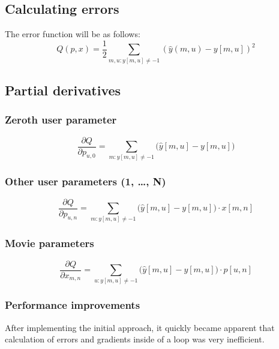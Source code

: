 \documentclass[12pt]{article}
\begin{document}
\subsection{Calculating errors}

The error function will be as follows:
$$
	Q(p,x) = \frac{1}{2} \sum\limits_{m,u : y[m,u] \neq -1} (\hat{y}(m,u) - y[m,u])^2
$$

\subsection{Partial derivatives}

\subsubsection{Zeroth user parameter}

$$
	\frac{\partial Q}{\partial p_{u, 0}} = \sum_{m : y[m,u] \neq -1} \big(\hat{y}[m, u] - y[m, u]\big)
$$

\subsubsection{Other user parameters (1, \dots, N)}

$$
	\frac{\partial Q}{\partial p_{u, n}} = \sum_{m : y[m,u] \neq -1} \big(\hat{y}[m, u] - y[m, u]\big) \cdot x[m, n]
$$

\subsubsection{Movie parameters}

$$
	\frac{\partial Q}{\partial x_{m, n}} = \sum_{u : y[m,u] \neq -1} \big(\hat{y}[m, u] - y[m, u]\big) \cdot p[u, n]
$$

\subsubsection{Performance improvements}

After implementing the initial approach, it quickly became apparent that calculation of errors and gradients inside of a loop was very inefficient.
\end{document}
